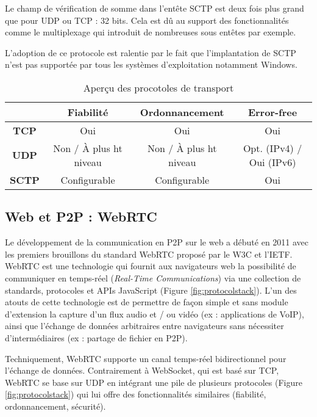 Le champ de vérification de somme dans l'entête \gls{SCTP} est deux fois plus 
grand que pour \gls{UDP} ou \gls{TCP} : 32 bits. Cela est dû au support des 
fonctionnalités comme le multiplexage qui introduit de nombreuses sous entêtes 
par exemple.

L'adoption de ce protocole est ralentie par le fait que l'implantation de \gls{SCTP} 
n'est pas supportée par tous les systèmes d'exploitation notamment 
Windows\cite{Hogg}. 

\begin{table}[h]
	\caption{Aperçu des procotoles de transport}
	\noindent\small
	\begin{tabular}{cccc}
		& \textbf{Fiabilité} & \textbf{Ordonnancement} & \textbf{Error-free} \\ 
		\hline 
		\textbf{TCP} & Oui & Oui & Oui \\ 
		\hline 
		\textbf{UDP} & Non / À plus ht niveau & Non / À plus 
		ht 
		niveau & Opt. 
		(IPv4) / 
		Oui (IPv6) \\ 
		\hline 
		\textbf{SCTP} & Configurable & Configurable &  Oui \\ 
		\hline
	\end{tabular} 
\end{table}

\subsection{Web et P2P : WebRTC}
\label{sec:webrtc}
Le développement de la communication en \gls{P2P} sur le web a 
débuté en 2011 avec les premiers brouillons du standard \gls{WebRTC} proposé 
par le \gls{W3C} et l'\gls{IETF}\textsuperscript{\textregistered}. 
\gls{WebRTC} est une technologie qui fournit aux navigateurs web la possibilité de 
communiquer en temps-réel (\textit{Real-Time Communications}) via une collection 
de standards, protocoles et \glspl{API} JavaScript (Figure \ref{fig:protocolstack}). 
L'un des atouts de cette technologie est de permettre de façon simple et 
sans module d'extension la capture d'un flux audio et / ou vidéo (ex : 
applications de VoIP), ainsi que l'échange de données arbitraires entre 
navigateurs sans nécessiter d'intermédiaires (ex : partage de fichier en 
P2P).


Techniquement, \gls{WebRTC} supporte un canal temps-réel 
bidirectionnel pour l'échange de données. Contrairement à 
\gls{WebSocket}, qui est basé sur \gls{TCP}, \gls{WebRTC} se base sur 
\acrshort{UDP} en intégrant une pile de plusieurs protocoles (Figure 
\ref{fig:protocolstack}) qui lui offre des fonctionnalités similaires (fiabilité, 
ordonnancement, sécurité). 


